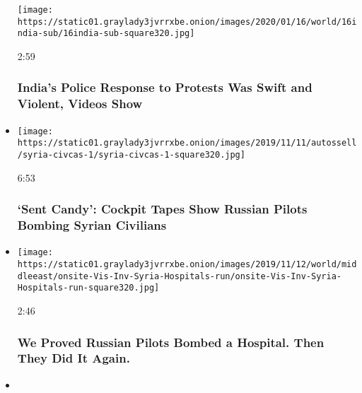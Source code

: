 \begin{itemize}
  \texttt{[image: https://static01.graylady3jvrrxbe.onion/images/2020/01/16/world/16india-sub/16india-sub-square320.jpg]}

  2:59

  \hypertarget{indias-police-response-to-protests-was-swift-and-violent-videos-show}{%
  \subsubsection{India's Police Response to Protests Was Swift and
  Violent, Videos
  Show}\label{indias-police-response-to-protests-was-swift-and-violent-videos-show}}
\item
  \href{https://www.nytimes3xbfgragh.onion/video/world/middleeast/100000006818506/russia-bombs-syria-civlians.html?action=click\&module=video-series-bar\&region=header\&pgtype=Article\&playlistId=video/investigations}{}

  \texttt{[image: https://static01.graylady3jvrrxbe.onion/images/2019/11/11/autossell/syria-civcas-1/syria-civcas-1-square320.jpg]}

  6:53

  \hypertarget{sent-candy-cockpit-tapes-show-russian-pilots-bombing-syrian-civilians}{%
  \subsubsection{`Sent Candy': Cockpit Tapes Show Russian Pilots Bombing
  Syrian
  Civilians}\label{sent-candy-cockpit-tapes-show-russian-pilots-bombing-syrian-civilians}}
\item
  \href{https://www.nytimes3xbfgragh.onion/video/world/middleeast/100000006815692/syria-hospitals-russia.html?action=click\&module=video-series-bar\&region=header\&pgtype=Article\&playlistId=video/investigations}{}

  \texttt{[image: https://static01.graylady3jvrrxbe.onion/images/2019/11/12/world/middleeast/onsite-Vis-Inv-Syria-Hospitals-run/onsite-Vis-Inv-Syria-Hospitals-run-square320.jpg]}

  2:46

  \hypertarget{we-proved-russian-pilots-bombed-a-hospital-then-they-did-it-again}{%
  \subsubsection{We Proved Russian Pilots Bombed a Hospital. Then They
  Did It
  Again.}\label{we-proved-russian-pilots-bombed-a-hospital-then-they-did-it-again}}
\item
  \href{https://www.nytimes3xbfgragh.onion/video/world/middleeast/100000005697485/russia-bombed-syrian-hospitals.html?action=click\&module=video-series-bar\&region=header\&pgtype=Article\&playlistId=video/investigations}{}


\end{itemize}
